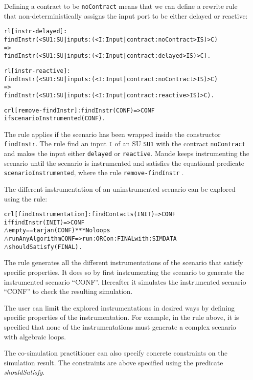 Defining a contract to be \texttt{noContract} means that we can define a rewrite rule that non-deterministically assigns the input port to be either delayed or reactive:
\scriptsize
\begin{alltt}
rl [instr-delayed]: 
  findInstr(< SU1 : SU | inputs : (< I : Input | contract : noContract > IS) > C)
  =>
  findInstr(< SU1 : SU | inputs : (< I : Input | contract : delayed > IS) > C) .

rl [instr-reactive]: 
  findInstr(< SU1 : SU | inputs : (< I : Input | contract :   noContract > IS) > C)
  =>
  findInstr(< SU1 : SU | inputs : (< I : Input | contract : reactive > IS) > C) .

crl [remove-findInstr]: findInstr(CONF) => CONF 
  if scenarioInstrumented(CONF) .
\end{alltt}
\normalsize
The rule applies if the scenario has been wrapped inside the constructor \texttt{findInstr}.
The rule find an input \texttt{I} of an SU \texttt{SU1} with the contract \texttt{noContract} and makes the input either \texttt{delayed} or \texttt{reactive}.
Maude keeps instrumenting the scenario until the scenario is instrumented and satisfies the equational predicate \texttt{scenarioInstrumented}, where the rule \texttt{remove-findInstr} .

The different instrumentation of an uninstrumented scenario can be explored using the rule:

\small
\begin{alltt}
crl [findInstrumentation]: findContacts(INIT) => CONF
    if findInstr(INIT) => CONF
    \(\land\) empty == tarjan(CONF) *** No loops
    \(\land\) runAnyAlgorithm CONF => run: ORC on: FINAL with: SIMDATA
    \(\land\) shouldSatisfy(FINAL) .
\end{alltt}
\normalsize
The rule generates all the different instrumentations of the scenario that satisfy specific properties.
It does so by first instrumenting the scenario to generate the instrumented scenario ``CONF''.
Hereafter it simulates the instrumented scenario ``CONF'' to check the resulting simulation.

The user can limit the explored instrumentations in desired ways by defining specific properties of the instrumentation.
For example, in the rule above, it is specified that none of the instrumentations must generate a complex scenario with algebraic loops.

The co-simulation practitioner can also specify concrete constraints on the simulation result.
The constraints are above specified using the predicate \emph{shouldSatisfy}.

